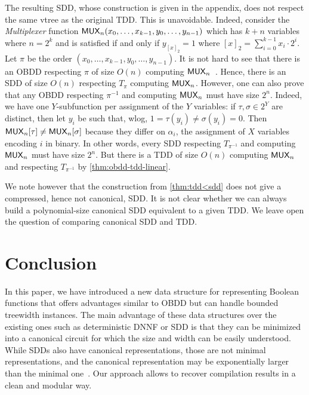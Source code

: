 \documentclass[a4paper,UKenglish,cleveref, autoref, thm-restate]{lipics-v2021}
\newcommand{\guy}[1]{\todo[color=purple]{\color{white}{{\bf Guy}: #1}}}
\begin{document}
The resulting SDD, whose construction is given in the appendix, does not respect the same vtree as the original TDD. This is unavoidable. Indeed, consider the \emph{Multiplexer} function $\mathsf{MUX}_n(x_0,\dots,x_{k-1},y_0,\dots,y_{n-1})$ which has $k+n$ variables where $n=2^k$ and is satisfied if and only if $y_{[x]_2} = 1$ where $[x]_2 = \sum_{i=0}^{k-1} x_i \cdot 2^i$. Let $\pi$ be the order $(x_0,\dots,x_{k-1},y_0,\dots,y_{n-1})$. It is not hard to see that there is an OBDD respecting $\pi$ of size $O(n)$ computing $\mathsf{MUX}_n$~\cite[Theorem 4.3.2]{Wegener00}. Hence, there is an SDD of size $O(n)$ respecting $T_\pi$ computing $\mathsf{MUX}_n$. However, one can also prove that any OBDD respecting $\pi^{-1}$ and computing $\mathsf{MUX}_n$ must have size $2^{n}$. Indeed, we have one $Y$-subfunction per assignment of the $Y$ variables: if $\tau,\sigma \in 2^Y$ are distinct, then let $y_i$ be such that, wlog, $1 = \tau(y_i) \neq \sigma(y_i) = 0$. Then $\mathsf{MUX}_n[\tau] \neq \mathsf{MUX}_n[\sigma]$ because they differ on $\alpha_i$, the assignment of $X$ variables encoding $i$ in binary.
In other words, every SDD respecting $T_{\pi^{-1}}$ and computing $\mathsf{MUX}_n$ must have size $2^{n}$. But there is a TDD of size $O(n)$ computing $\mathsf{MUX}_n$ and respecting $T_{\pi^{-1}}$ by \cref{thm:obdd-tdd-linear}. 

We note however that the construction from \cref{thm:tdd<sdd} does not give a compressed, hence not canonical, SDD. It is not clear whether we can always build a polynomial-size canonical SDD equivalent to a given TDD. We leave open the question of comparing canonical SDD and TDD. 


\section{Conclusion}

In this paper, we have introduced a new data structure for representing Boolean functions that offers advantages similar to OBDD but can handle bounded treewidth instances. The main advantage of these data structures over the existing ones such as deterministic DNNF or SDD is that they can be minimized into a canonical circuit for which the size and width can be easily understood. While SDDs also have canonical representations, those are not minimal representations, and the canonical representation may be exponentially larger than the minimal one~\cite{van2015role}. Our approach allows to recover compilation results in a clean and modular way.
\end{document}
